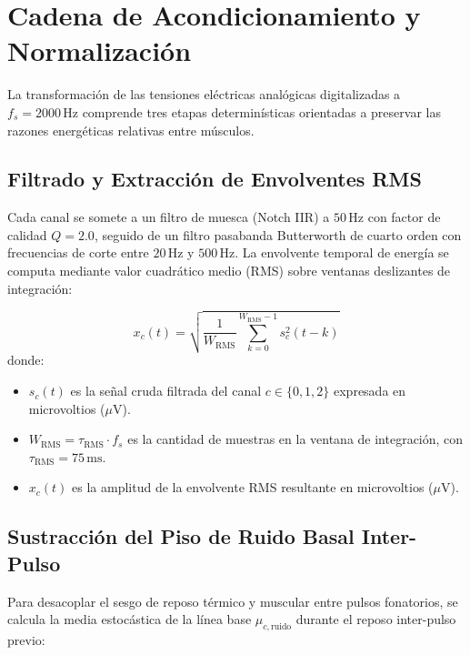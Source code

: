 \documentclass[11pt,a4paper]{article}
\begin{document}
\section{Cadena de Acondicionamiento y Normalización}
\label{sec:acondicionamiento}

La transformación de las tensiones eléctricas analógicas digitalizadas a $f_s = 2000\,\text{Hz}$ comprende tres etapas determinísticas orientadas a preservar las razones energéticas relativas entre músculos.

\subsection{Filtrado y Extracción de Envolventes RMS}
\label{subsec:filtrado_rms}

Cada canal se somete a un filtro de muesca (Notch IIR) a $50\,\text{Hz}$ con factor de calidad $Q = 2.0$, seguido de un filtro pasabanda Butterworth de cuarto orden con frecuencias de corte entre $20\,\text{Hz}$ y $500\,\text{Hz}$. La envolvente temporal de energía se computa mediante valor cuadrático medio (RMS) sobre ventanas deslizantes de integración:

\begin{equation}
    x_c(t) = \sqrt{\frac{1}{W_{\text{RMS}}} \sum_{k=0}^{W_{\text{RMS}}-1} s_c^2(t - k)}
    \label{eq:rms_envolvente}
\end{equation}
donde:
\begin{itemize}
    \item $s_c(t)$ es la señal cruda filtrada del canal $c \in \{0, 1, 2\}$ expresada en microvoltios ($\mu\text{V}$).
    \item $W_{\text{RMS}} = \tau_{\text{RMS}} \cdot f_s$ es la cantidad de muestras en la ventana de integración, con $\tau_{\text{RMS}} = 75\,\text{ms}$.
    \item $x_c(t)$ es la amplitud de la envolvente RMS resultante en microvoltios ($\mu\text{V}$).
\end{itemize}

\subsection{Sustracción del Piso de Ruido Basal Inter-Pulso}
\label{subsec:sustraccion_ruido}

Para desacoplar el sesgo de reposo térmico y muscular entre pulsos fonatorios, se calcula la media estocástica de la línea base $\mu_{c,\text{ruido}}$ durante el reposo inter-pulso previo:
\end{document}
